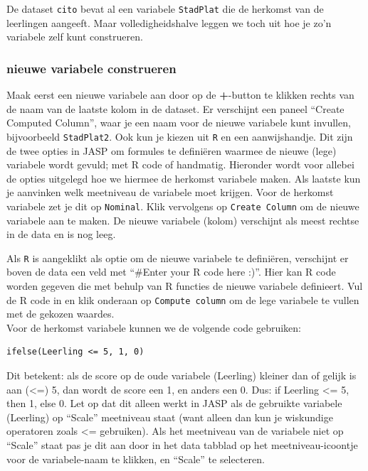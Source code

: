 \documentclass[
]{book}
\begin{document}
De dataset \texttt{cito} bevat al een variabele \texttt{StadPlat} die de herkomst van de leerlingen aangeeft. Maar volledigheidshalve leggen we toch uit hoe je zo'n variabele zelf kunt construeren.

\subsubsection{nieuwe variabele construeren}\label{nieuwe-variabele-construeren-1}

Maak eerst een nieuwe variabele aan door op de \textbf{+}-button te klikken rechts van de naam van de laatste kolom in de dataset. Er verschijnt een paneel ``Create Computed Column'', waar je een naam voor de nieuwe variabele kunt invullen, bijvoorbeeld \texttt{StadPlat2}. Ook kun je kiezen uit \texttt{R} en een aanwijshandje. Dit zijn de twee opties in JASP om formules te definiëren waarmee de nieuwe (lege) variabele wordt gevuld; met R code of handmatig. Hieronder wordt voor allebei de opties uitgelegd hoe we hiermee de herkomst variabele maken. Als laatste kun je aanvinken welk meetniveau de variabele moet krijgen. Voor de herkomst variabele zet je dit op \texttt{Nominal}. Klik vervolgens op \texttt{Create\ Column} om de nieuwe variabele aan te maken. De nieuwe variabele (kolom) verschijnt als meest rechtse in de data en is nog leeg.

Als \texttt{R} is aangeklikt als optie om de nieuwe variabele te definiëren, verschijnt er boven de data een veld met ``\#Enter your R code here :)''. Hier kan R code worden gegeven die met behulp van R functies de nieuwe variabele definieert. Vul de R code in en klik onderaan op \texttt{Compute\ column} om de lege variabele te vullen met de gekozen waardes.\\
Voor de herkomst variabele kunnen we de volgende code gebruiken:

\begin{verbatim}
ifelse(Leerling <= 5, 1, 0) 
\end{verbatim}

Dit betekent: als de score op de oude variabele (Leerling) kleiner dan of gelijk is aan (\textless=) 5, dan wordt de score een 1, en anders een 0. Dus: if Leerling \textless= 5, then 1, else 0. Let op dat dit alleen werkt in JASP als de gebruikte variabele (Leerling) op ``Scale'' meetniveau staat (want alleen dan kun je wiskundige operatoren zoals \textless= gebruiken). Als het meetniveau van de variabele niet op ``Scale'' staat pas je dit aan door in het data tabblad op het meetniveau-icoontje voor de variabele-naam te klikken, en ``Scale'' te selecteren.
\end{document}
